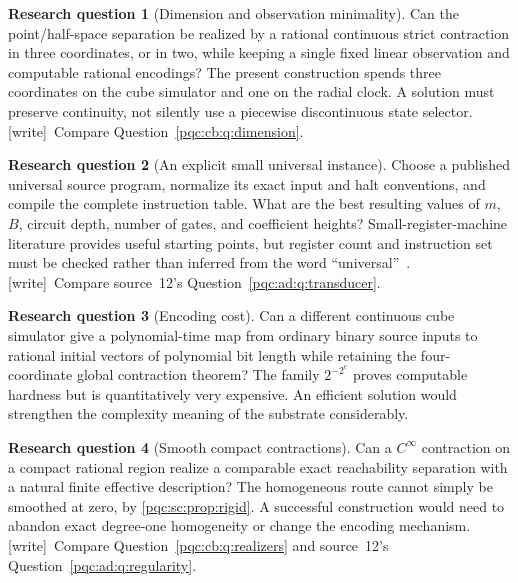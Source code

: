 \documentclass[11pt,letterpaper]{article}
\numberwithin{equation}{section}
\theoremstyle{definition}
\newtheorem{question}{Research question}
\theoremstyle{remark}
\newcommand{\wtag}{\textup{[write]}}
\begin{document}
\begin{question}[Dimension and observation minimality]\label{pqc:sc:q:dimension}
Can the point/half-space separation be realized by a rational continuous
strict contraction in three coordinates, or in two, while keeping a single
fixed linear observation and computable rational encodings? The present
construction spends three coordinates on the cube simulator and one on the
radial clock. A solution must preserve continuity, not silently use a
piecewise discontinuous state selector.
\wtag\ Compare Question~\ref{pqc:cb:q:dimension}.
\end{question}

\begin{question}[An explicit small universal instance]\label{pqc:sc:q:instance}
Choose a published universal source program, normalize its exact input and
halt conventions, and compile the complete instruction table. What are the
best resulting values of $m$, $B$, circuit depth, number of gates, and
coefficient heights? Small-register-machine literature provides useful
starting points, but register count and instruction set must be checked
rather than inferred from the word ``universal''~\cite{b62s14-korec}.
\wtag\ Compare source~12's Question~\ref{pqc:ad:q:transducer}.
\end{question}

\begin{question}[Encoding cost]
Can a different continuous cube simulator give a polynomial-time map from
ordinary binary source inputs to rational initial vectors of polynomial bit
length while retaining the four-coordinate global contraction theorem?
The family $2^{-2^e}$ proves computable hardness but is quantitatively very
expensive. An efficient solution would strengthen the complexity meaning of
the substrate considerably.
\end{question}

\begin{question}[Smooth compact contractions]\label{pqc:sc:q:smooth}
Can a $C^\infty$ contraction on a compact rational region realize a comparable
exact reachability separation with a natural finite effective description?
The homogeneous route cannot simply be smoothed at zero, by
\cref{pqc:sc:prop:rigid}. A successful construction would need to abandon exact
degree-one homogeneity or change the encoding mechanism.
\wtag\ Compare Question~\ref{pqc:cb:q:realizers} and source~12's Question~\ref{pqc:ad:q:regularity}.
\end{question}
\end{document}
